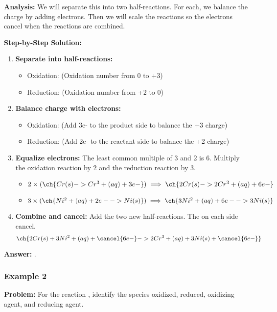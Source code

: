 \documentclass{article}
\begin{document}
\textbf{Analysis:} We will separate this into two half-reactions. For each, we balance the charge by adding electrons. Then we will scale the reactions so the electrons cancel when the reactions are combined.

\textbf{Step-by-Step Solution:}
\begin{enumerate}
    \item \textbf{Separate into half-reactions:}
        \begin{itemize}
            \item Oxidation:  (Oxidation number from 0 to +3)
            \item Reduction:  (Oxidation number from +2 to 0)
        \end{itemize}
    \item \textbf{Balance charge with electrons:}
        \begin{itemize}
            \item Oxidation:  (Add 3e- to the product side to balance the +3 charge)
            \item Reduction:  (Add 2e- to the reactant side to balance the +2 charge)
        \end{itemize}
    \item \textbf{Equalize electrons:} The least common multiple of 3 and 2 is 6. Multiply the oxidation reaction by 2 and the reduction reaction by 3.
        \begin{itemize}
            \item $2 \times (\ch{Cr(s) -> Cr^3+(aq) + 3e-}) \implies \ch{2Cr(s) -> 2Cr^3+(aq) + 6e-}$
            \item $3 \times (\ch{Ni^2+(aq) + 2e- -> Ni(s)}) \implies \ch{3Ni^2+(aq) + 6e- -> 3Ni(s)}$
        \end{itemize}
    \item \textbf{Combine and cancel:} Add the two new half-reactions. The  on each side cancel.
    \[ \ch{2Cr(s) + 3Ni^2+(aq) + \cancel{6e-} -> 2Cr^3+(aq) + 3Ni(s) + \cancel{6e-}} \]
\end{enumerate}

\textbf{Answer:} \textbf{}.

\subsubsection{Example 2}
\textbf{Problem:} For the reaction , identify the species oxidized, reduced, oxidizing agent, and reducing agent.
\end{document}
